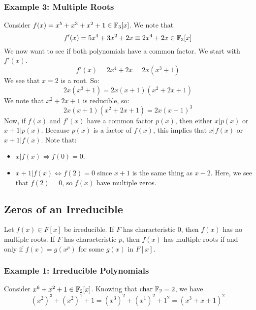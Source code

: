 \documentclass[letterpaper]{article}
\begin{document}
\subsubsection{Example 3: Multiple Roots}
Consider $f(x) = x^5 + x^3 + x^2 + 1 \in \mathbb{F}_{3}[x]$. We note that 
\[f'(x) = 5x^4 + 3x^2 + 2x \equiv 2x^4 + 2x \in \mathbb{F}_{3}[x]\]
We now want to see if both polynomials have a common factor. We start with $f'(x)$. 
\[f'(x) = 2x^4 + 2x = 2x(x^3 + 1)\]
We see that $x = 2$ is a root. So: 
\[2x(x^3 + 1) = 2x(x + 1)(x^2 + 2x + 1)\]
We note that $x^2 + 2x + 1$ is reducible, so: 
\[2x(x + 1)(x^2 + 2x + 1) = 2x(x + 1)^3\]
Now, if $f(x)$ and $f'(x)$ have a common factor $p(x)$, then either $x | p(x)$ or $x + 1 | p(x)$. Because $p(x)$ is a factor of $f(x)$, this implies that $x | f(x)$ or $x + 1 | f(x)$. Note that: 
\begin{itemize}
    \item $x | f(x) \iff f(0) = 0$. 
    \item $x + 1 | f(x) \iff f(2) = 0$ since $x + 1$ is the same thing as $x - 2$. Here, we see that $f(2) = 0$, so $f(x)$ have multiple zeros.
\end{itemize}

\subsection{Zeros of an Irreducible}
\begin{theorem}{}{}
    Let $f(x) \in F[x]$ be irreducible. If $F$ has characteristic 0, then $f(x)$ has no multiple roots. If $F$ has characteristic $p$, then $f(x)$ has multiple roots if and only if $f(x) = g(x^p)$ for some $g(x)$ in $F[x]$. 
\end{theorem}

\subsubsection{Example 1: Irreducible Polynomials}
Consider $x^6 + x^2 + 1 \in \mathbb{F}_{2}[x]$. Knowing that $\text{char } \mathbb{F}_{2} = 2$, we have  
\[(x^2)^3 + (x^2)^1 + 1 = (x^3)^2 + (x^1)^2 + 1^2 = (x^3 + x + 1)^2\]
\end{document}
